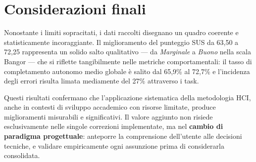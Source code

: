 \section{Considerazioni finali}

Nonostante i limiti sopracitati, i dati raccolti disegnano un quadro coerente e statisticamente incoraggiante. Il miglioramento del punteggio SUS da 63,50 a 72,25 rappresenta un solido salto qualitativo --- da \textit{Marginale} a \textit{Buono} nella scala Bangor --- che si riflette tangibilmente nelle metriche comportamentali: il tasso di completamento autonomo medio globale è salito dal 65,9\% al 72,7\% e l'incidenza degli errori risulta limata mediamente del 27\% attraverso i task.

Questi risultati confermano che l'applicazione sistematica della metodologia HCI, anche in contesti di sviluppo accademico con risorse limitate, produce miglioramenti misurabili e significativi. Il valore aggiunto non risiede esclusivamente nelle singole correzioni implementate, ma nel \textbf{cambio di paradigma progettuale}: anteporre la comprensione dell'utente alle decisioni tecniche, e validare empiricamente ogni assunzione prima di considerarla consolidata.
